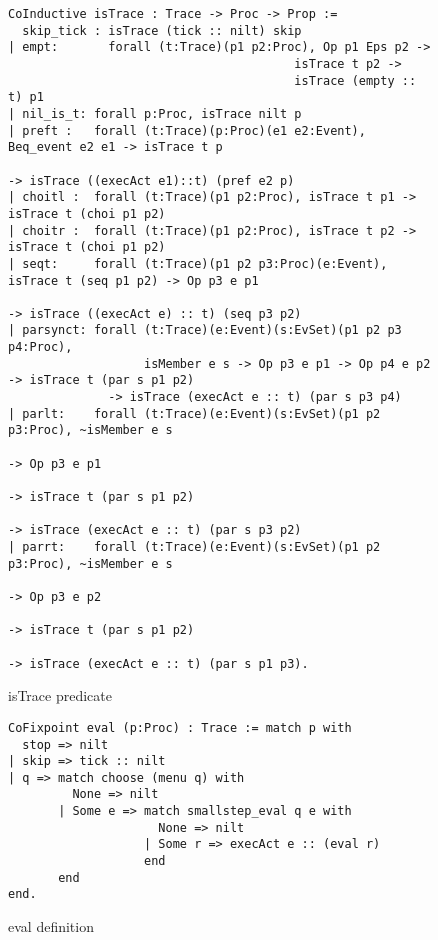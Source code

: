 \documentclass{comjnl}
\begin{document}
\begin{figure*}
\caption{\label{fig:my-label} isTrace predicate}
\begin{verbatim}
CoInductive isTrace : Trace -> Proc -> Prop :=
  skip_tick : isTrace (tick :: nilt) skip
| empt:       forall (t:Trace)(p1 p2:Proc), Op p1 Eps p2 -> 
                                        isTrace t p2 -> 
                                        isTrace (empty :: t) p1
| nil_is_t: forall p:Proc, isTrace nilt p
| preft :   forall (t:Trace)(p:Proc)(e1 e2:Event), Beq_event e2 e1 -> isTrace t p 
                                                                     -> isTrace ((execAct e1)::t) (pref e2 p)
| choitl :  forall (t:Trace)(p1 p2:Proc), isTrace t p1 -> isTrace t (choi p1 p2)
| choitr :  forall (t:Trace)(p1 p2:Proc), isTrace t p2 -> isTrace t (choi p1 p2)
| seqt:     forall (t:Trace)(p1 p2 p3:Proc)(e:Event), isTrace t (seq p1 p2) -> Op p3 e p1 
                                                                           -> isTrace ((execAct e) :: t) (seq p3 p2)
| parsynct: forall (t:Trace)(e:Event)(s:EvSet)(p1 p2 p3 p4:Proc),
                   isMember e s -> Op p3 e p1 -> Op p4 e p2 -> isTrace t (par s p1 p2) 
              -> isTrace (execAct e :: t) (par s p3 p4)
| parlt:    forall (t:Trace)(e:Event)(s:EvSet)(p1 p2 p3:Proc), ~isMember e s 
                                                                                           -> Op p3 e p1 
                                                                                           -> isTrace t (par s p1 p2) 
                                                                                           -> isTrace (execAct e :: t) (par s p3 p2)
| parrt:    forall (t:Trace)(e:Event)(s:EvSet)(p1 p2 p3:Proc), ~isMember e s 
                                                                                           -> Op p3 e p2 
                                                                                           -> isTrace t (par s p1 p2) 
                                                                                           -> isTrace (execAct e :: t) (par s p1 p3).
\end{verbatim} 
\end{figure*}

\begin{figure*}
\caption{\label{fig:my-label} eval definition}
\begin{verbatim}
CoFixpoint eval (p:Proc) : Trace := match p with
  stop => nilt
| skip => tick :: nilt
| q => match choose (menu q) with
         None => nilt
       | Some e => match smallstep_eval q e with
                     None => nilt
                   | Some r => execAct e :: (eval r)
                   end
       end
end.
\end{verbatim}
\end{figure*}
\end{document}
